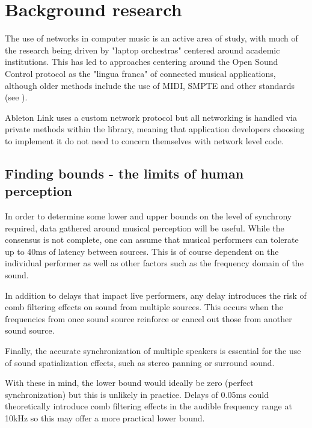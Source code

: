 \documentclass[11pt]{article} %
\theoremstyle{plain}
\theoremstyle{definition}
\begin{document}
\section{Background research}

The use of networks in computer music is an active area of study, with much of
the research being driven by "laptop orchestras"\cite{trueman2007laptop}
centered around academic institutions. This has led to approaches centering
around the Open Sound Control
protocol\cite{wright2005open}\cite{madgwick2015simple}\cite{narveson2013landini}
as the "lingua franca" of connected musical applications, although older
methods include the use of MIDI, SMPTE and other standards (see \cite{goltz2018ableton}).

Ableton Link uses a custom network protocol but all networking is handled via
private methods within the library, meaning that application developers
choosing to implement it do not need to concern themselves with network level code.

\subsection{Finding bounds - the limits of human perception}

In order to determine some lower and upper bounds on the level of synchrony
required, data gathered around musical perception will be useful. While the
consensus is not complete\cite{greeff2016influence}, one can assume that
musical performers can tolerate up to 40ms of latency between sources. This is
of course dependent on the individual performer as well as other factors such
as the frequency domain of the sound.

In addition to delays that impact live performers, any delay introduces the
risk of comb filtering effects on sound from multiple sources. This occurs when
the frequencies from once sound source reinforce or cancel out those from
another sound source.

Finally, the accurate synchronization of multiple speakers is essential for the
use of sound spatialization effects, such as stereo panning or surround sound.

With these in mind, the lower bound would ideally be zero (perfect
synchronization) but this is unlikely in practice. Delays of 0.05ms could
theoretically introduce comb filtering effects in the audible frequency range
at 10kHz\cite{lester2007effects} so this may offer a more practical lower bound.
\end{document}
